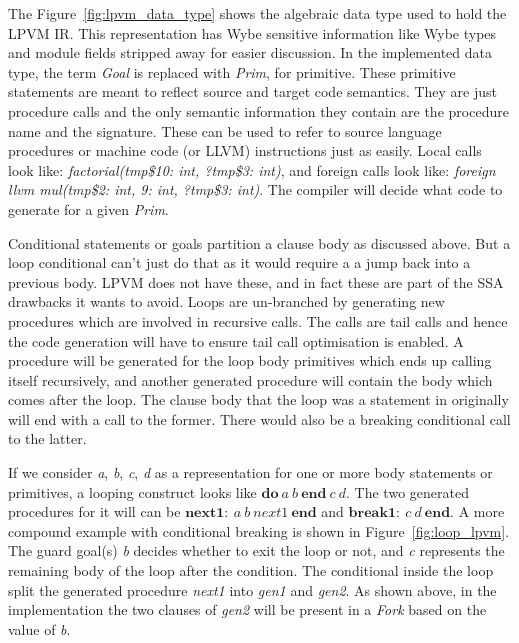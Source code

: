 The Figure~\ref{fig:lpvm_data_type} shows the algebraic data type used to hold
the LPVM IR. This representation has Wybe sensitive information like Wybe types
and module fields stripped away for easier discussion. In the implemented data
type, the term \textit{Goal} is replaced with \textit{Prim}, for
primitive. These primitive statements are meant to reflect source and target
code semantics. They are just procedure calls and the only semantic information
they contain are the procedure name and the signature. These can be used to
refer to source language procedures or machine code (or LLVM) instructions just
as easily. Local calls look like: \textit{factorial(tmp\$10: int, ?tmp\$3:
  int)}, and foreign calls look like: \textit{foreign llvm mul(tmp\$2: int, 9:
  int, ?tmp\$3: int)}. The compiler will decide what code to generate for a
given \textit{Prim}.

Conditional statements or goals partition a clause body as discussed above. But
a loop conditional can't just do that as it would require a a jump back into a
previous body. LPVM does not have these, and in fact these are part of the SSA
drawbacks it wants to avoid. Loops are un-branched by generating new procedures
which are involved in recursive calls. The calls are tail calls and hence the
code generation will have to ensure tail call optimisation is
enabled. A procedure will be generated for the loop body primitives which ends
up calling itself recursively, and another generated procedure will contain the
body which comes after the loop. The clause body that the loop was a statement
in originally will end with a call to the former. There would also be a
breaking conditional call to the latter.

If we consider \textit{a}, \textit{b}, \textit{c}, \textit{d} as a
representation for one or more body statements or primitives, a looping
construct looks like \( \mathbf{do}\ a\ b\ \mathbf{end}\ c\ d\). The two
generated procedures for it will can be
\( \mathbf{next1:}\ a\ b\ next1\ \mathbf{end} \) and
\( \mathbf{break1:}\ c\ d\ \mathbf{end} \). A more compound example with
conditional breaking is shown in Figure~\ref{fig:loop_lpvm}. The guard goal(s)
\textit{b} decides whether to exit the loop or not, and \textit{c} represents
the remaining body of the loop after the condition. The conditional inside the
loop split the generated procedure \textit{next1} into \textit{gen1} and
\textit{gen2}. As shown above, in the implementation the two clauses of
\textit{gen2} will be present in a \textit{Fork} based on the value of \textit{b}.



